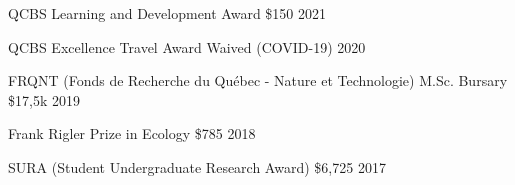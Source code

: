 \vspace{5pt}

\begin{cvhonors}

  \cvhonor
    {QCBS Learning and Development Award} %
    {} %
    {\$150} %
    {2021} %

  \cvhonor
    {QCBS Excellence Travel Award} %
    {} %
    {Waived (COVID-19)} %
    {2020} %

  \cvhonor
    {FRQNT (Fonds de Recherche du Québec - Nature et Technologie) M.Sc. Bursary} %
    {} %
    {\$17,5k} %
    {2019} %

  \cvhonor
    {Frank Rigler Prize in Ecology} %
    {} %
    {\$785} %
    {2018} %

  \cvhonor
    {SURA (Student Undergraduate Research Award)} %
    {} %
    {\$6,725} %
    {2017} %
    

\end{cvhonors}
\vspace{20pt}